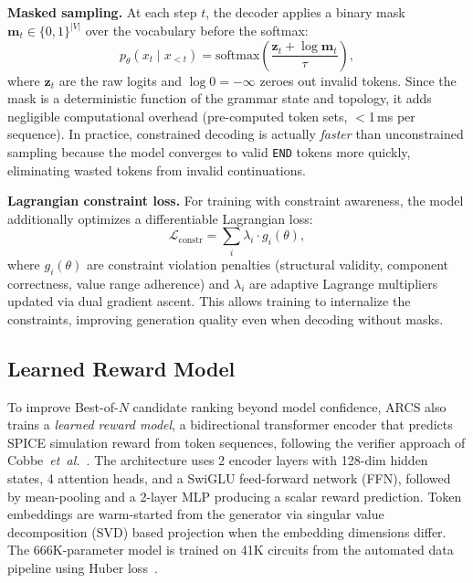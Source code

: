 \documentclass[conference]{IEEEtran}
\begin{document}
\textbf{Masked sampling.} At each step $t$, the decoder applies a binary mask
$\mathbf{m}_t \in \{0, 1\}^{|V|}$ over the vocabulary
before the softmax:
\begin{equation}
p_\theta(x_t \mid x_{<t}) = \text{softmax}\!\left(
\frac{\mathbf{z}_t + \log \mathbf{m}_t}{\tau}\right),
\label{eq:masked}
\end{equation}
where $\mathbf{z}_t$ are the raw logits and $\log 0 = -\infty$
zeroes out invalid tokens. Since the mask is a deterministic
function of the grammar state and topology, it adds negligible
computational overhead (pre-computed token sets, $<$1\,ms per
sequence). In practice, constrained decoding is actually
\emph{faster} than unconstrained sampling because the model
converges to valid \texttt{END} tokens more quickly, eliminating
wasted tokens from invalid continuations.

\textbf{Lagrangian constraint loss.} For training with constraint
awareness, the model additionally optimizes a differentiable Lagrangian loss:
\begin{equation}
\mathcal{L}_\text{constr} = \sum_{i} \lambda_i \cdot g_i(\theta),
\label{eq:lagrangian}
\end{equation}
where $g_i(\theta)$ are constraint violation penalties (structural
validity, component correctness, value range adherence) and
$\lambda_i$ are adaptive Lagrange multipliers updated via dual
gradient ascent. This allows training to internalize the constraints,
improving generation quality even when decoding without masks.

\subsection{Learned Reward Model}
\label{sec:method-reward}

To improve Best-of-$N$ candidate ranking beyond model confidence,
ARCS also trains a \emph{learned reward model}, a bidirectional transformer
encoder that predicts SPICE simulation reward from token sequences,
following the verifier approach of Cobbe~\emph{et~al.}~\cite{cobbe2021verifiers}.
The architecture uses 2 encoder layers with 128-dim hidden states,
4 attention heads, and a SwiGLU feed-forward network (FFN), followed
by mean-pooling and a 2-layer MLP producing a scalar reward prediction.
Token embeddings are warm-started from the generator via
singular value decomposition (SVD) based projection when the
embedding dimensions differ. The 666K-parameter model is trained on
41K circuits from the automated data pipeline using Huber
loss~\cite{huber1964}.
\end{document}
